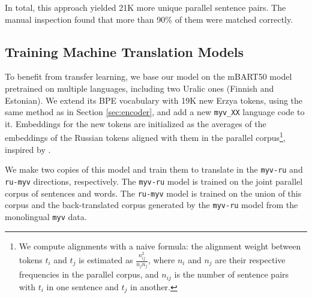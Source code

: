\documentclass[11pt]{article}
\begin{document}
In total, this approach yielded 21K more unique parallel sentence pairs. The manual inspection found that more than 90\% of them were matched correctly.

\subsection{Training Machine Translation Models}
To benefit from transfer learning, we base our model on the mBART50 model \cite{tang2020multilingual} pretrained on multiple languages, including two Uralic ones (Finnish and Estonian). We extend its BPE vocabulary with 19K new Erzya tokens, using the same method as in Section \ref{sec:encoder}, and add a new \texttt{myv\_XX} language code to it. Embeddings for the new tokens are initialized as the averages of the embeddings of the Russian tokens aligned with them in the parallel corpus\footnote{We compute alignments with a naive formula: the alignment weight between tokens $t_i$ and $t_j$ is estimated as $\frac{n_{ij}^2}{n_jn_j}$, where $n_i$ and $n_j$ are their respective frequencies in the parallel corpus, and $n_{ij}$ is the number of sentence pairs with $t_i$ in one sentence and $t_j$ in another.}, inspired by \citet{xu-hong-2022-sub}.

We make two copies of this model and train them to translate in the \texttt{myv-ru} and \texttt{ru-myv} directions, respectively. The \texttt{myv-ru} model is trained on the joint parallel corpus of sentences and words. The \texttt{ru-myv} model is trained on the union of this corpus and the back-translated corpus generated by the \texttt{myv-ru} model from the monolingual \texttt{myv} data. 
\end{document}

